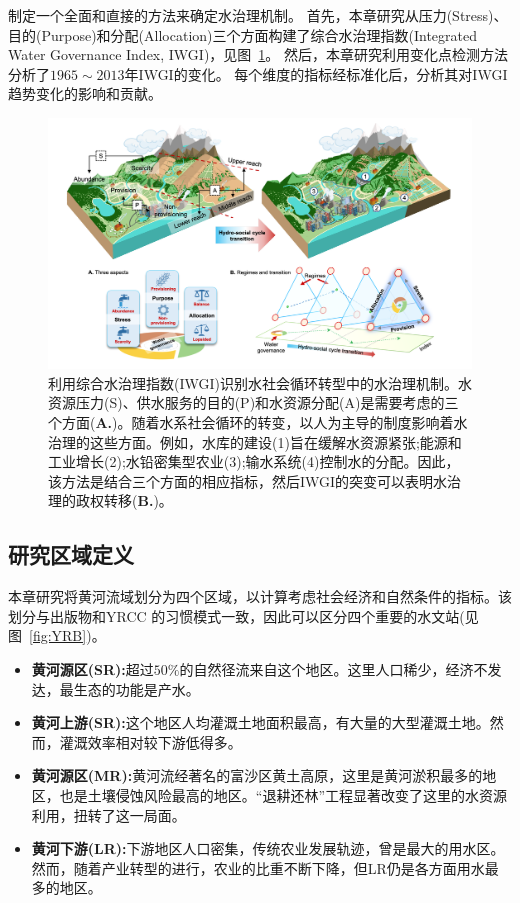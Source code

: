 制定一个全面和直接的方法来确定水治理机制。
首先，本章研究从压力(Stress)、目的(Purpose)和分配(Allocation)三个方面构建了综合水治理指数(Integrated Water Governance Index, IWGI)，见图~\ref{fig:ch4:framework}。
然后，本章研究利用变化点检测方法分析了$1965\sim2013$年IWGI的变化。
每个维度的指标经标准化后，分析其对IWGI趋势变化的影响和贡献。


\begin{figure}[!ht]
\centering
\includegraphics[width=\textwidth]{img/ch4/framework.png}
\caption[利用综合水治理指数(IWGI)识别水社会循环转型中的水治理机制]{
    利用综合水治理指数(IWGI)识别水社会循环转型中的水治理机制。水资源压力(S)、供水服务的目的(P)和水资源分配(A)是需要考虑的三个方面(\textbf{A.})。随着水系社会循环的转变，以人为主导的制度影响着水治理的这些方面。例如，水库的建设(1)旨在缓解水资源紧张;能源和工业增长(2);水铅密集型农业(3);输水系统(4)控制水的分配。因此，该方法是结合三个方面的相应指标，然后IWGI的突变可以表明水治理的政权转移(\textbf{B.})。
}
\label{fig:ch4:framework}
\end{figure}

\subsection{研究区域定义}
\label{ch4:sec:region}

本章研究将黄河流域划分为四个区域，以计算考虑社会经济和自然条件的指标。该划分与出版物和YRCC \cite{shuilibuhuangheshuiliweiyuanhui,wang2019c,wang2016e}的习惯模式一致，因此可以区分四个重要的水文站(见图~\ref{fig:YRB})。
\begin{itemize}
\item \textbf{黄河源区(SR):}超过$50\%$的自然径流来自这个地区。这里人口稀少，经济不发达，最生态的功能是产水。
\item \textbf{黄河上游(SR):}这个地区人均灌溉土地面积最高，有大量的大型灌溉土地。然而，灌溉效率相对较下游低得多。
\item \textbf{黄河源区(MR):}黄河流经著名的富沙区黄土高原，这里是黄河淤积最多的地区，也是土壤侵蚀风险最高的地区。“退耕还林”工程显著改变了这里的水资源利用，扭转了这一局面。
\item \textbf{黄河下游(LR):}下游地区人口密集，传统农业发展轨迹，曾是最大的用水区。然而，随着产业转型的进行，农业的比重不断下降，但LR仍是各方面用水最多的地区。
\end{itemize}

